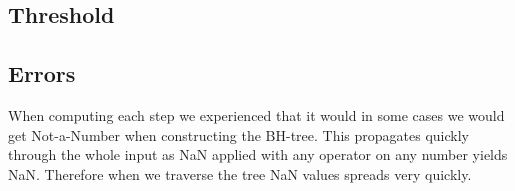 \begin{Figure}
  \centering
\lstset{firstnumber=41}

\end{Figure}

\subsection{Threshold}

\subsection{Errors}\label{sec:errors}
When computing each step we experienced that it would in some cases we would get
Not-a-Number when constructing the BH-tree. This propagates quickly through the
whole input as NaN applied with any operator on any number yields NaN. Therefore
when we traverse the tree NaN values spreads very quickly.
